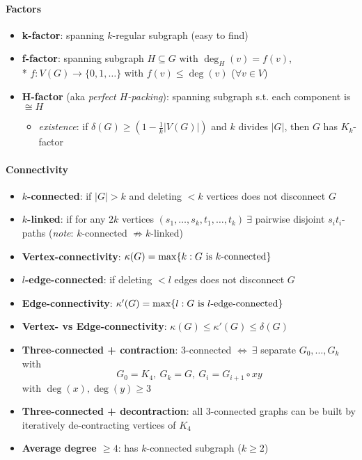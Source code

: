 \paragraph{Factors}
\begin{itemize}
  \item \textbf{k-factor}: spanning $ k $-regular subgraph (easy to find) 
  \item \textbf{f-factor}: spanning subgraph $ H \subseteq G $ with $ \deg_H(v) = f(v) $, \\*
    $ f: V(G) \to \{ 0,1,\dots \} $ with $ f(v) \leq \deg(v) $ \quad ($ \forall v \in V $)
  \item \textbf{H-factor} (aka \emph{perfect $ H $-packing}): spanning subgraph s.t. each component is $ \cong H $
  \begin{itemize}
    \item \emph{existence}: if $ \delta(G) \geq \left( 1 - \tfrac{1}{k}\vert V(G) \vert \right) $ and $ k $ divides $ \vert G \vert $, then $ G $ has $ K_k $-factor
  \end{itemize}
\end{itemize}

\paragraph{Connectivity}
\begin{itemize}
  \item \textbf{$ k $-connected}: if $ \vert G \vert > k $ and deleting $ < k $ vertices does not disconnect $ G $
  \item \textbf{$ k $-linked}: if for any $ 2k $ vertices $ (s_1, \dots, s_k, t_1, \dots, t_k) \ \exists $ pairwise disjoint $ s_it_i $-paths (\emph{note}: $ k $-connected $ \not \Rightarrow k $-linked)
  \item \textbf{Vertex-connectivity}: $ \kappa(G) = \max\{ k : \text{$ G $ is $ k $-connected} \} $
  \item \textbf{$ l $-edge-connected}: if deleting $ < l $ edges does not disconnect $ G $
  \item \textbf{Edge-connectivity}: $ \kappa'(G) = \max\{ l : \text{$ G $ is $ l $-edge-connected} \} $
  \item \textbf{Vertex- vs Edge-connectivity}: $ \kappa(G) \leq \kappa'(G) \leq \delta(G) $
  \item \textbf{Three-connected + contraction}: $ 3 $-connected $ \Leftrightarrow \ \exists $ separate $ G_0, \dots, G_k $ with
  \begin{equation*}
    G_0 = K_4, \ G_k = G, \ G_i = G_{i+1} \circ xy
  \end{equation*}
  with $ \deg(x), \deg(y) \geq 3 $
  \item \textbf{Three-connected + decontraction}: all $ 3 $-connected graphs can be built by iteratively de-contracting vertices of $ K_4 $
  \item \textbf{Average degree $ \geq 4 $}: has $ k $-connected subgraph ($ k \geq 2 $)
\end{itemize}

